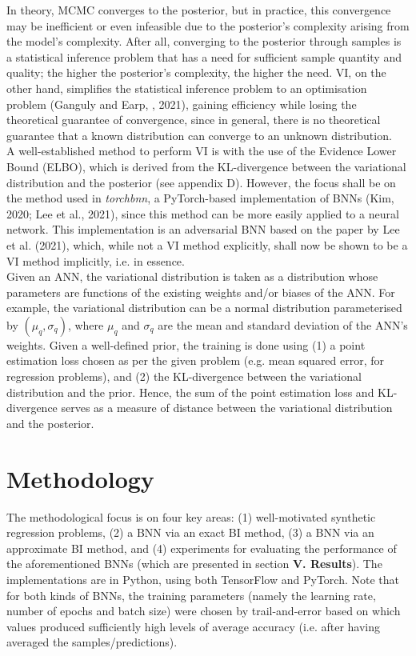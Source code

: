 \documentclass[conference]{IEEEtran}
\begin{document}
In theory, MCMC converges to the posterior, but in practice, this convergence may be inefficient or even infeasible due to the posterior's complexity arising from the model's complexity. After all, converging to the posterior through samples is a statistical inference problem that has a need for sufficient sample quantity and quality; the higher the posterior's complexity, the higher the need. VI, on the other hand, simplifies the statistical inference problem to an optimisation problem (Ganguly and Earp, , 2021), gaining efficiency while losing the theoretical guarantee of convergence, since in general, there is no theoretical guarantee that a known distribution can converge to an unknown distribution.\\

A well-established method to perform VI is with the use of the Evidence Lower Bound (ELBO), which is derived from the KL-divergence between the variational distribution and the posterior (see appendix D). However, the focus shall be on the method used in \textit{torchbnn}, a PyTorch-based implementation of BNNs (Kim, 2020; Lee et al., 2021), since this method can be more easily applied to a neural network. This implementation is an adversarial BNN based on the paper by Lee et al. (2021), which, while not a VI method explicitly, shall now be shown to be a VI method implicitly, i.e. in essence.\\

Given an ANN, the variational distribution is taken as a distribution whose parameters are functions of the existing weights and/or biases of the ANN. For example, the variational distribution can be a normal distribution parameterised by $(\mu_q, \sigma_q)$, where $\mu_q$ and $\sigma_q$ are the mean and standard deviation of the ANN's weights. Given a well-defined prior, the training is done using (1) a point estimation loss chosen as per the given problem (e.g. mean squared error, for regression problems), and (2) the KL-divergence between the variational distribution and the prior. Hence, the sum of the point estimation loss and KL-divergence serves as a measure of distance between the variational distribution and the posterior.

\section{Methodology}
The methodological focus is on four key areas: (1) well-motivated synthetic regression problems, (2) a BNN via an exact BI method, (3) a BNN via an approximate BI method, and (4) experiments for evaluating the performance of the aforementioned BNNs (which are presented in section \textbf{V. Results}). The implementations are in Python, using both TensorFlow and PyTorch. Note that for both kinds of BNNs, the training parameters (namely the learning rate, number of epochs and batch size) were chosen by trail-and-error based on which values produced sufficiently high levels of average accuracy (i.e. after having averaged the samples/predictions).
\end{document}
